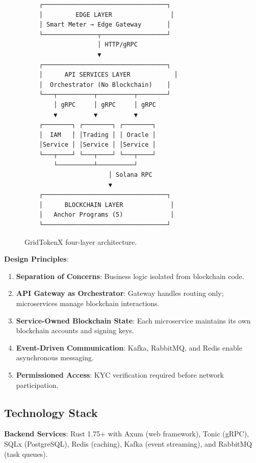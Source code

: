 \documentclass[conference]{IEEEtran}
\begin{document}
\begin{figure}[htbp]
    \centering
    \footnotesize
    \begin{verbatim}
    ┌──────────────────────────────────┐
    │         EDGE LAYER                │
    │ Smart Meter → Edge Gateway       │
    └───────────────┬──────────────────┘
                    │ HTTP/gRPC
                    ▼
    ┌──────────────────────────────────┐
    │      API SERVICES LAYER            │
    │  Orchestrator (No Blockchain)    │
    └───┬──────────┬──────────┬────────┘
        │ gRPC     │ gRPC     │ gRPC
        ▼          ▼          ▼
    ┌────────┐ ┌────────┐ ┌────────┐
    │  IAM   │ │Trading │ │ Oracle │
    │Service │ │Service │ │Service │
    └───┬────┘ └───┬────┘ └───┬────┘
        └──────────┴──────────┘
                       │ Solana RPC
                       ▼
    ┌──────────────────────────────────┐
    │      BLOCKCHAIN LAYER             │
    │   Anchor Programs (5)             │
    └──────────────────────────────────┘
    \end{verbatim}
    \caption{GridTokenX four-layer architecture.}
    \label{fig:architecture}
\end{figure}

\textbf{Design Principles}:

\begin{enumerate}
    \item \textbf{Separation of Concerns}: Business logic isolated from blockchain code.
    \item \textbf{API Gateway as Orchestrator}: Gateway handles routing only; microservices manage blockchain interactions.
    \item \textbf{Service-Owned Blockchain State}: Each microservice maintains its own blockchain accounts and signing keys.
    \item \textbf{Event-Driven Communication}: Kafka, RabbitMQ, and Redis enable asynchronous messaging.
    \item \textbf{Permissioned Access}: KYC verification required before network participation.
\end{enumerate}

\subsection{Technology Stack}

\textbf{Backend Services}: Rust 1.75+ with Axum (web framework), Tonic (gRPC), SQLx (PostgreSQL), Redis (caching), Kafka (event streaming), and RabbitMQ (task queues).
\end{document}
